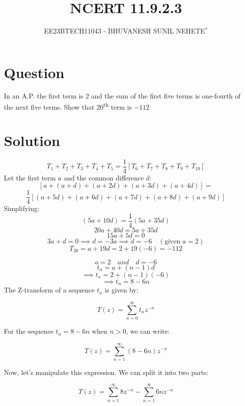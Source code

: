 \documentclass[journal,12pt,twocolumn]{IEEEtran}
\theoremstyle{remark}
\begin{document}

\vspace{3cm}

\title{NCERT 11.9.2.3}
\author{EE23BTECH11043 - BHUVANESH SUNIL NEHETE$^{*}$%
}
\maketitle
\newpage
\bigskip

\renewcommand{\thefigure}{\theenumi}
\renewcommand{\thetable}{\theenumi}



\section*{Question}

In an A.P. the first term is 2 and the sum of the first five terms is one-fourth of the next five terms. Show that 20\textsuperscript{th} term is $-112$

\section*{Solution}

\[T_1 + T_2 + T_3 + T_4 + T_5 = \frac{1}{4} [T_6 + T_7 + T_8 + T_9 + T_{10}]\]
Let the first term \(a\) and the common difference \(d\):
\[[a + (a + d) + (a + 2d) + (a + 3d) + (a + 4d)] =\] 
\[\frac{1}{4} [(a + 5d) + (a + 6d) + (a + 7d) + (a + 8d) + (a + 9d)]\]
Simplifying:
\[(5a + 10d) = \frac{1}{4}(5a + 35d)\]
\[20a + 40d = 5a + 35d\]
\[15a + 5d = 0\]
\[3a + d = 0 \implies d = -3a \implies d = -6 \quad (\text{given } a = 2)\]
\[T_{20} = a + 19d = 2 + 19(-6) = -112\]

\[a=2\quad and\quad d=-6\]
\[t_{n}=a+(n-1)d\]
\[\implies t_{n}=2+(n-1)(-6)\]
\[\implies t_{n}=8-6n\]
The Z-transform of a sequence $t_n$ is given by:

\[ T(z) = \sum_{n=0}^{\infty} t_n z^{-n} \]

For the sequence $t_n = 8 - 6n$ when $n > 0$, we can write:

\[ T(z) = \sum_{n=1}^{\infty} (8 - 6n)z^{-n} \]

Now, let's manipulate this expression. We can split it into two parts:

\[ T(z) = \sum_{n=1}^{\infty} 8z^{-n} - \sum_{n=1}^{\infty} 6nz^{-n} \]
\end{document}
